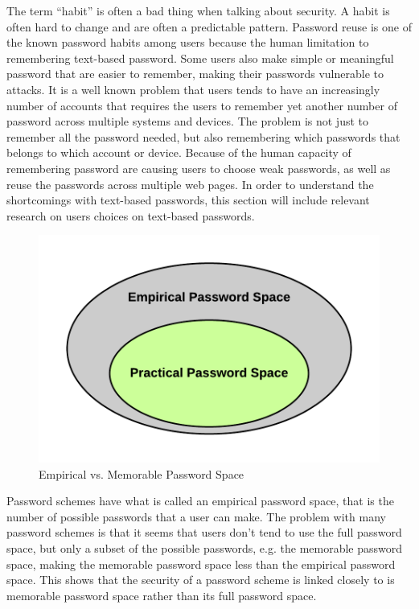   The term ``habit'' is often a bad thing when talking about security. A habit is often hard to change and are often a predictable pattern. Password reuse is one of the known password habits among users because the human limitation to remembering text-based password. Some users also make simple or meaningful password that are easier to remember, making their passwords vulnerable to attacks. It is a well known problem that users tends to have an increasingly number of accounts that requires the users to remember yet another number of password across multiple systems and devices. The problem is not just to remember all the password needed, but also remembering which passwords that belongs to which account or device. Because of the human capacity of remembering password are causing users to choose weak passwords, as well as reuse the passwords across multiple web pages. In order to understand the shortcomings with text-based passwords, this section will include relevant research on users choices on text-based passwords.  

    \begin{figure}
      \vspace{-20pt}
      \begin{center}
        \includegraphics[scale=0.16]{pics/EmpiricalVsPractical.png}
      \end{center}
      \vspace{-20pt}
      \caption{Empirical vs. Memorable Password Space}
      \vspace{0pt}
    \end{figure}

  Password schemes have what is called an empirical password space, that is the number of possible passwords that a user can make. The problem with many password schemes is that it seems that users don't tend to use the full password space, but only a subset of the possible passwords, e.g. the memorable password space, making the memorable password space less than the empirical password space. This shows that the security of a password scheme is linked closely to is memorable password space rather than its full password space.

